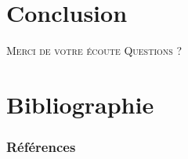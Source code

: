 \documentclass{cubeamer}
\begin{document}
\section{Conclusion}

\begin{frame}[standout]
    \Huge\textsc{Merci de votre écoute}
    \vfill
    \LARGE\textsc{Questions ?}
\end{frame}

\section*{Bibliographie}

\begin{frame}[allowframebreaks]
    \frametitle{Références}
    \nocite{*}
    
    
\end{frame}
\end{document}
